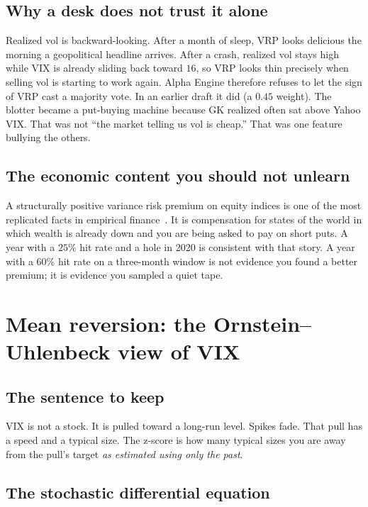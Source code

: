 \documentclass[11pt,a4paper]{article}
\begin{document}
\subsection{Why a desk does not trust it alone}

Realized vol is backward-looking. After a month of sleep, VRP looks delicious the morning a geopolitical headline arrives. After a crash, realized vol stays high while VIX is already sliding back toward $16$, so VRP looks thin precisely when selling vol is starting to work again. Alpha Engine therefore refuses to let the sign of VRP cast a majority vote. In an earlier draft it did (a $0.45$ weight). The blotter became a put-buying machine because GK realized often sat above Yahoo VIX. That was not ``the market telling us vol is cheap.'' That was one feature bullying the others.

\subsection{The economic content you should not unlearn}

A structurally positive variance risk premium on equity indices is one of the most replicated facts in empirical finance~\cite{carrwu2009,bollerslev2009}. It is compensation for states of the world in which wealth is already down and you are being asked to pay on short puts. A year with a $25\%$ hit rate and a hole in 2020 is consistent with that story. A year with a $60\%$ hit rate on a three-month window is not evidence you found a better premium; it is evidence you sampled a quiet tape.

\section{Mean reversion: the Ornstein--Uhlenbeck view of VIX}
\label{ch:ou}

\subsection{The sentence to keep}

VIX is not a stock. It is pulled toward a long-run level. Spikes fade. That pull has a speed and a typical size. The z-score is how many typical sizes you are away from the pull's target \emph{as estimated using only the past}.

\subsection{The stochastic differential equation}
\end{document}
